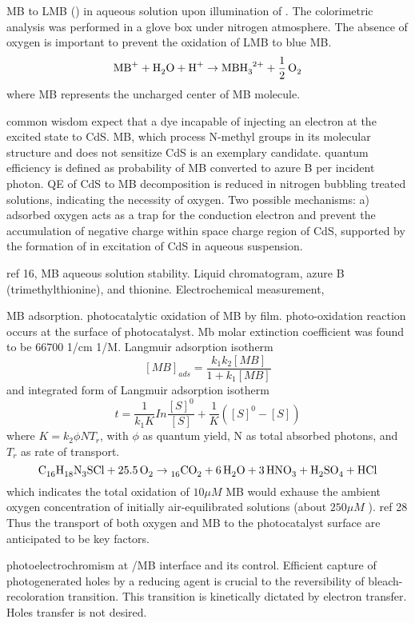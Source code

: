 \documentclass[11pt]{article} %
\begin{document}
\cite{Yoneyama1972} MB to LMB () in aqueous solution upon illumination of . The colorimetric analysis was performed in a glove box under nitrogen atmosphere. The absence of oxygen is important to prevent the oxidation of LMB to blue MB.
\[
\cee{MB^+ + H2O + H^+ \rightarrow MBH3^{2+} + 1/2O2}
\]
where MB represents the uncharged center of MB molecule.

\cite{Takizawa1978} common wisdom expect that a dye incapable of injecting an electron at the excited state to CdS. MB, which process N-methyl groups in its molecular structure and does not sensitize CdS is an exemplary candidate. quantum efficiency is defined as probability of MB converted to azure B per incident photon. QE of CdS to MB decomposition is reduced in nitrogen bubbling treated solutions, indicating the necessity of oxygen. Two possible mechanisms: a) adsorbed oxygen acts as a trap for the conduction electron and prevent the accumulation of negative charge within space charge region of CdS, supported by the formation of  in excitation of CdS in aqueous suspension.

ref 16, MB aqueous solution stability. Liquid chromatogram, azure B (trimethylthionine), and thionine. Electrochemical measurement,

\cite{Matthews1989} MB adsorption.  photocatalytic oxidation of MB by  film. photo-oxidation reaction occurs at the surface of photocatalyst. Mb molar extinction coefficient was found to be 66700 1/cm 1/M. Langmuir adsorption isotherm
\[
[MB]_{ads} = \frac{k_1 k_2 [MB]}{1 + k_1[MB]}
\]
and integrated form of Langmuir adsorption isotherm
\[
t = \frac{1}{k_1K} In\frac{[S]^0}{[S]} + \frac{1}{K}([S]^0 - [S])
\]
where $K = k_2 \phi N T_r$, with $\phi$ as quantum yield, N as total absorbed photons, and $T_r$ as rate of transport.
\[
\cee{C16H18N3SCl + 25.5O2 \rightarrow 16CO2 + 6H2O + 3HNO3 + H2SO4 +HCl}
\]
which indicates the total oxidation of $10 \mu M$ MB would exhause the ambient oxygen concentration of initially air-equilibrated solutions (about $250 \mu M$ ). ref 28 Thus the transport of both oxygen and MB to the photocatalyst surface are anticipated to be key factors.

\cite{DeTacconi1997} photoelectrochromism at /MB interface and its control. Efficient capture of photogenerated holes by a reducing agent is crucial to the reversibility of bleach-recoloration transition. This transition is kinetically dictated by electron transfer. Holes transfer is not desired.
\end{document}
